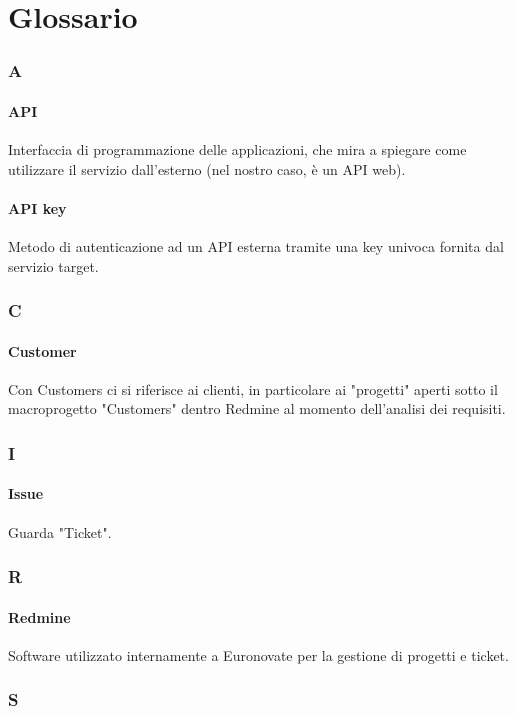 
\setcounter{secnumdepth}{0} %
\setcounter{tocdepth}{0} %


\chapter{Glossario}

\setcounter{secnumdepth}{1} %
\setcounter{tocdepth}{3} %
\subsection{A}
\subsubsection{API}
Interfaccia di programmazione delle applicazioni, che mira a spiegare come utilizzare il servizio dall'esterno (nel nostro caso, è un API web).
\subsubsection{API key}
Metodo di autenticazione ad un API esterna tramite una key univoca fornita dal servizio target.
\subsection{C}
\subsubsection{Customer}
Con Customers ci si riferisce ai clienti, in particolare ai "progetti" aperti sotto il macroprogetto "Customers" dentro Redmine al momento dell'analisi dei requisiti.
\subsection{I}
\subsubsection{Issue}
Guarda "Ticket".
\subsection{R}
\subsubsection{Redmine}
Software utilizzato internamente a Euronovate per la gestione di progetti e ticket.
\subsection{S}
